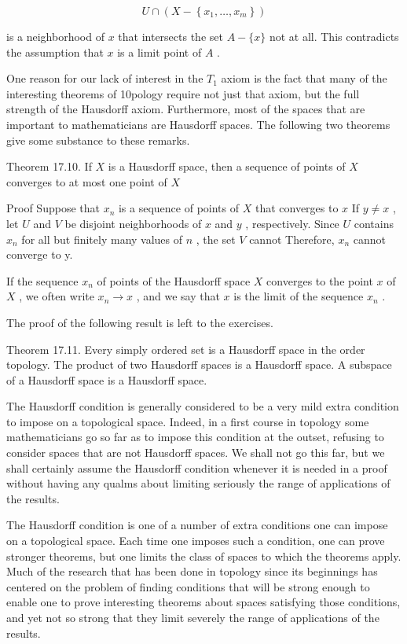 \documentclass[10pt]{article}
\begin{document}
\[
U \cap  \left( {X - \left\{  {{x}_{1},\ldots ,{x}_{m}}\right\}  }\right)
\]

is a neighborhood of \(x\) that intersects the set \(A - \{ x\}\) not at all. This contradicts the assumption that \(x\) is a limit point of \(A\) .

One reason for our lack of interest in the \({T}_{1}\) axiom is the fact that many of the interesting theorems of 10pology require not just that axiom, but the full strength of the Hausdorff axiom. Furthermore, most of the spaces that are important to mathematicians are Hausdorff spaces. The following two theorems give some substance to these remarks.

Theorem 17.10. If \(X\) is a Hausdorff space, then a sequence of points of \(X\) converges to at most one point of \(X\)

Proof Suppose that \({x}_{n}\) is a sequence of points of \(X\) that converges to \(x\) If \(y \neq  x\) , let \(U\) and \(V\) be disjoint neighborhoods of \(x\) and \(y\) , respectively. Since \(U\) contains \({x}_{n}\) for all but finitely many values of \(n\) , the set \(V\) cannot Therefore, \({x}_{n}\) cannot converge to y.

If the sequence \({x}_{n}\) of points of the Hausdorff space \(X\) converges to the point \(x\) of \(X\) , we often write \({x}_{n} \rightarrow  x\) , and we say that \(x\) is the limit of the sequence \({x}_{n}\) .

The proof of the following result is left to the exercises.

Theorem 17.11. Every simply ordered set is a Hausdorff space in the order topology. The product of two Hausdorff spaces is a Hausdorff space. A subspace of a Hausdorff space is a Hausdorff space.

The Hausdorff condition is generally considered to be a very mild extra condition to impose on a topological space. Indeed, in a first course in topology some mathematicians go so far as to impose this condition at the outset, refusing to consider spaces that are not Hausdorff spaces. We shall not go this far, but we shall certainly assume the Hausdorff condition whenever it is needed in a proof without having any qualms about limiting seriously the range of applications of the results.

The Hausdorff condition is one of a number of extra conditions one can impose on a topological space. Each time one imposes such a condition, one can prove stronger theorems, but one limits the class of spaces to which the theorems apply. Much of the research that has been done in topology since its beginnings has centered on the problem of finding conditions that will be strong enough to enable one to prove interesting theorems about spaces satisfying those conditions, and yet not so strong that they limit severely the range of applications of the results.
\end{document}
